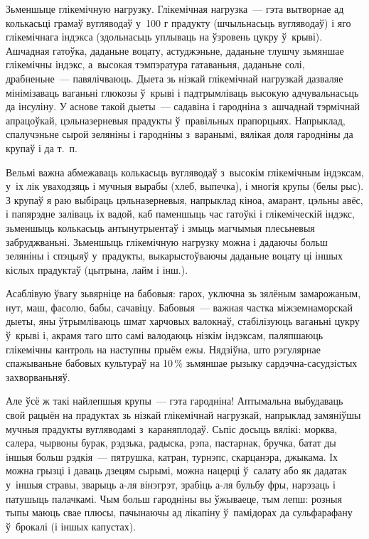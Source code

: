 Зьменшыце глікемічную нагрузку. Глікемічная нагрузка~--- гэта вытворнае ад колькасьці грамаў вугляводаў у~100 г прадукту (шчыльнасьць вугляводаў) і яго глікемічнага індэкса (здольнасьць уплываць на ўзровень цукру ў~крыві). Ашчадная гатоўка, даданьне воцату, астуджэньне, даданьне тлушчу зьмяншае глікемічны індэкс, а~высокая тэмпэратура гатаваньня, даданьне солі, драбненьне~--- павялічваюць. Дыета зь нізкай глікемічнай нагрузкай дазваляе мінімізаваць ваганьні глюкозы ў~крыві і падтрымліваць высокую адчувальнасьць да інсуліну. У аснове такой дыеты~--- садавіна і гародніна з~ашчаднай тэрмічнай апрацоўкай, цэльназерневыя прадукты ў~правільных прапорцыях. Напрыклад, спалучэньне сырой зеляніны і гародніны з~варанымі, вялікая доля гародніны да крупаў і да т.~п.

Вельмі важна абмежаваць колькасьць вугляводаў з~высокім глікемічным індэксам, у~іх лік уваходзяць і мучныя вырабы (хлеб, выпечка), і многія крупы (белы рыс). З крупаў я раю выбіраць цэльназерневыя, напрыклад кіноа, амарант, цэльны авёс, і папярэдне заліваць іх вадой, каб паменшыць час гатоўкі і глікеміческій індэкс, зьменшыць колькасьць антынутрыентаў і змыць магчымыя плесьневыя забруджваньні. Зьменшыць глікемічную нагрузку можна і дадаючы больш зеляніны і спэцыяў у~прадукты, выкарыстоўваючы даданьне воцату ці іншых кіслых прадуктаў (цытрына, лайм і інш.).

Асаблівую ўвагу зьвярніце на бабовыя: гарох, уключна зь зялёным замарожаным, нут, маш, фасолю, бабы, сачавіцу. Бабовыя~--- важная частка міжземнаморскай дыеты, яны ўтрымліваюць шмат харчовых валокнаў, стабілізуюць ваганьні цукру ў~крыві і, акрамя таго што самі валодаюць нізкім індэксам, паляпшаюць глікемічны кантроль на наступны прыём ежы. Нядзіўна, што рэгулярнае спажываньне бабовых культураў на 10\,\% зьмяншае рызыку сардэчна-сасудзістых захворваньняў.

Але ўсё ж такі найлепшыя крупы~--- гэта гародніна! Аптымальна выбудаваць свой рацыён на прадуктах зь нізкай глікемічнай нагрузкай, напрыклад замяніўшы мучныя прадукты вугляводамі з~караняплодаў. Сьпіс досыць вялікі: морква, салера, чырвоны бурак, рэдзька, радыска, рэпа, пастарнак, бручка, батат ды іншыя больш рэдкія~--- пятрушка, катран, турнэпс, скарцанэра, джыкама. Іх можна грызці і даваць дзецям сырымі, можна нацерці ў~салату або як дадатак у~іншыя стравы, зварыць а-ля вінэгрэт, зрабіць а-ля бульбу фры, нарэзаць і патушыць палачкамі. Чым больш гародніны вы ўжываеце, тым лепш: розныя тыпы маюць свае плюсы, пачынаючы ад лікапіну ў~памідорах да сульфарафану ў~брокалі (і іншых капустах).

